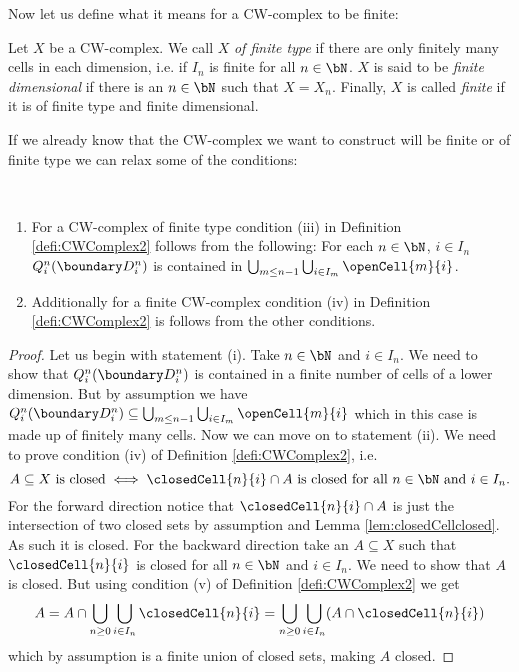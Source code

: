 Now let us define what it means for a CW-complex to be finite:

\begin{defi}
    Let $X$ be a CW-complex.
    We call $X$ \emph{of finite type} if there are only finitely many cells in each dimension, i.e. if $I_n$ is finite for all $n \in \bN$.
    $X$ is said to be \emph{finite dimensional} if there is an $n \in \bN$ such that $X = X_n$.
    Finally, $X$ is called \emph{finite} if it is of finite type and finite dimensional.
\end{defi}

If we already know that the CW-complex we want to construct will be finite or of finite type we can relax some of the conditions:

\begin{rem}~
    \begin{enumerate}
        \item For a CW-complex of finite type condition (iii) in Definition \ref{defi:CWComplex2} follows from the following:
        For each $n \in \bN$, $i \in I_n$ $Q_i^n(\boundary D_i^n)$ is contained in $\bigcup_{m \le n - 1}\bigcup_{i \in I_m}\openCell{m}{i}$.
        \item Additionally for a finite CW-complex condition (iv) in Definition \ref{defi:CWComplex2} is follows from the other conditions.
    \end{enumerate}
\end{rem}
\begin{proof}
    Let us begin with statement (i).
    Take $n \in \bN$ and $i \in I_n$.
    We need to show that $Q_i^n(\boundary D_i^n)$ is contained in a finite number of cells of a lower dimension.
    But by assumption we have $Q_i^n(\boundary D_i^n) \subseteq \bigcup_{m \le n - 1}\bigcup_{i \in I_m}\openCell{m}{i}$ which in this case is made up of finitely many cells.
    Now we can move on to statement (ii).
    We need to prove condition (iv) of Definition \ref{defi:CWComplex2}, i.e.
    \[A \subseteq X \text{ is closed} \iff \closedCell{n}{i} \cap A \text{ is closed for all } n \in \bN \text{ and } i \in I_n.\]
    For the forward direction notice that $\closedCell{n}{i} \cap A$ is just the intersection of two closed sets by assumption and Lemma \ref{lem:closedCellclosed}.
    As such it is closed.
    For the backward direction take an $A \subseteq X$ such that $\closedCell{n}{i}$ is closed for all $n \in \bN$ and $i \in I_n$.
    We need to show that $A$ is closed.
    But using condition (v) of Definition \ref{defi:CWComplex2} we get
    \[A = A \cap \bigcup_{n \ge 0}\bigcup_{i \in I_n} \closedCell{n}{i} = \bigcup_{n \ge 0}\bigcup_{i \in I_n} (A \cap \closedCell{n}{i})\]
    which by assumption is a finite union of closed sets, making $A$ closed.
\end{proof}

